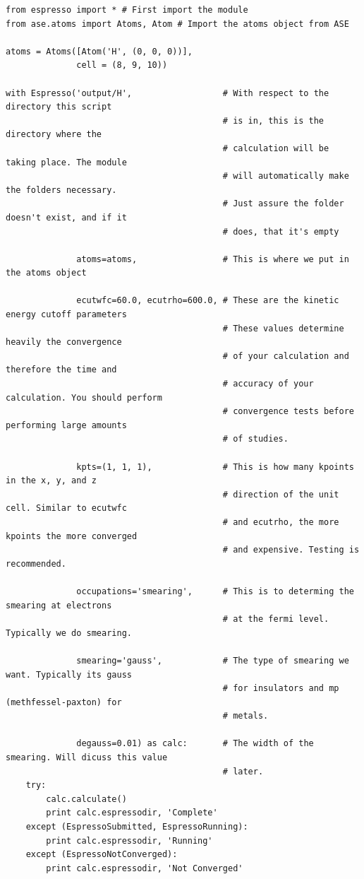 \documentclass[colorlinks=true,urlcolor=blue,linkcolor=blue,citecolor=red]{article}
\begin{document}
\begin{verbatim}
from espresso import * # First import the module
from ase.atoms import Atoms, Atom # Import the atoms object from ASE

atoms = Atoms([Atom('H', (0, 0, 0))],
              cell = (8, 9, 10))

with Espresso('output/H',                  # With respect to the directory this script
                                           # is in, this is the directory where the
                                           # calculation will be taking place. The module
                                           # will automatically make the folders necessary.
                                           # Just assure the folder doesn't exist, and if it
                                           # does, that it's empty

              atoms=atoms,                 # This is where we put in the atoms object

              ecutwfc=60.0, ecutrho=600.0, # These are the kinetic energy cutoff parameters
                                           # These values determine heavily the convergence
                                           # of your calculation and therefore the time and
                                           # accuracy of your calculation. You should perform
                                           # convergence tests before performing large amounts
                                           # of studies.

              kpts=(1, 1, 1),              # This is how many kpoints in the x, y, and z
                                           # direction of the unit cell. Similar to ecutwfc
                                           # and ecutrho, the more kpoints the more converged
                                           # and expensive. Testing is recommended.

              occupations='smearing',      # This is to determing the smearing at electrons
                                           # at the fermi level. Typically we do smearing.

              smearing='gauss',            # The type of smearing we want. Typically its gauss
                                           # for insulators and mp (methfessel-paxton) for
                                           # metals.

              degauss=0.01) as calc:       # The width of the smearing. Will dicuss this value
                                           # later.
    try:
        calc.calculate()
        print calc.espressodir, 'Complete'
    except (EspressoSubmitted, EspressoRunning):
        print calc.espressodir, 'Running'
    except (EspressoNotConverged):
        print calc.espressodir, 'Not Converged'
\end{verbatim}
\end{document}
